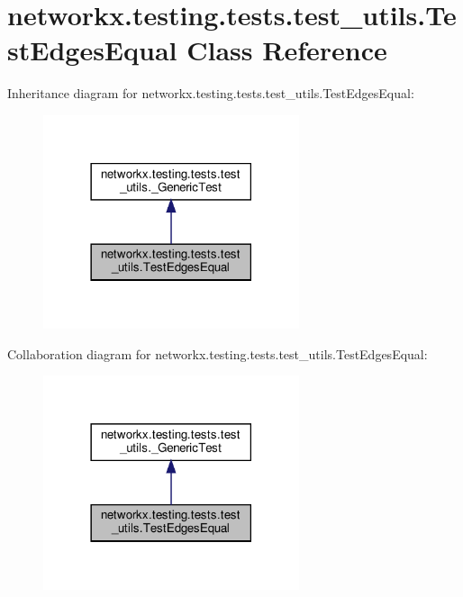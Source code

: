 \hypertarget{classnetworkx_1_1testing_1_1tests_1_1test__utils_1_1TestEdgesEqual}{}\section{networkx.\+testing.\+tests.\+test\+\_\+utils.\+Test\+Edges\+Equal Class Reference}
\label{classnetworkx_1_1testing_1_1tests_1_1test__utils_1_1TestEdgesEqual}


Inheritance diagram for networkx.\+testing.\+tests.\+test\+\_\+utils.\+Test\+Edges\+Equal\+:
\nopagebreak
\begin{figure}[H]
\begin{center}
\leavevmode
\includegraphics[width=213pt]{classnetworkx_1_1testing_1_1tests_1_1test__utils_1_1TestEdgesEqual__inherit__graph}
\end{center}
\end{figure}


Collaboration diagram for networkx.\+testing.\+tests.\+test\+\_\+utils.\+Test\+Edges\+Equal\+:
\nopagebreak
\begin{figure}[H]
\begin{center}
\leavevmode
\includegraphics[width=213pt]{classnetworkx_1_1testing_1_1tests_1_1test__utils_1_1TestEdgesEqual__coll__graph}
\end{center}
\end{figure}
